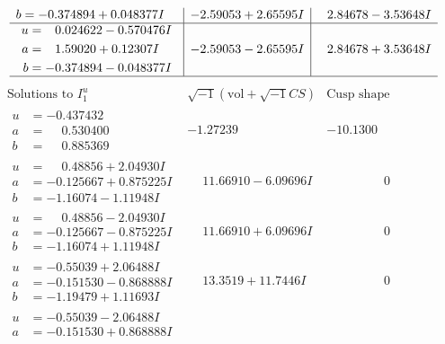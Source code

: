 \documentclass[1p]{elsarticle_modified}
\theoremstyle{definition}
\newcommand{\I}{\sqrt{-1}}
\begin{document}
$$\begin{array}{c|c|c}
\begin{aligned}
b &= -0.374894 + 0.048377 I\end{aligned}
 & -2.59053 + 2.65595 I & \phantom{-}2.84678 - 3.53648 I \\ \hline\begin{aligned}
u &= \phantom{-}0.024622 - 0.570476 I \\
a &= \phantom{-}1.59020 + 0.12307 I \\
b &= -0.374894 - 0.048377 I\end{aligned}
 & -2.59053 - 2.65595 I & \phantom{-}2.84678 + 3.53648 I\\
 \hline 
 \end{array}$$\newpage$$\begin{array}{c|c|c}  
\text{Solutions to }I^u_{1}& \I (\text{vol} + \sqrt{-1}CS) & \text{Cusp shape}\\
 \hline 
\begin{aligned}
u &= -0.437432\phantom{ +0.000000I} \\
a &= \phantom{-}0.530400\phantom{ +0.000000I} \\
b &= \phantom{-}0.885369\phantom{ +0.000000I}\end{aligned}
 & -1.27239\phantom{ +0.000000I} & -10.1300\phantom{ +0.000000I} \\ \hline\begin{aligned}
u &= \phantom{-}0.48856 + 2.04930 I \\
a &= -0.125667 + 0.875225 I \\
b &= -1.16074 - 1.11948 I\end{aligned}
 & \phantom{-}11.66910 - 6.09696 I & \phantom{-0.000000 } 0 \\ \hline\begin{aligned}
u &= \phantom{-}0.48856 - 2.04930 I \\
a &= -0.125667 - 0.875225 I \\
b &= -1.16074 + 1.11948 I\end{aligned}
 & \phantom{-}11.66910 + 6.09696 I & \phantom{-0.000000 } 0 \\ \hline\begin{aligned}
u &= -0.55039 + 2.06488 I \\
a &= -0.151530 - 0.868888 I \\
b &= -1.19479 + 1.11693 I\end{aligned}
 & \phantom{-}13.3519 + 11.7446 I & \phantom{-0.000000 } 0 \\ \hline\begin{aligned}
u &= -0.55039 - 2.06488 I \\
a &= -0.151530 + 0.868888 I \\

\end{aligned}
\end{array}$$
\end{document}
